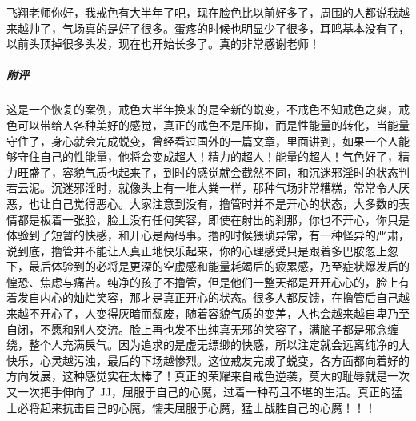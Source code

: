 \begin{case}
    飞翔老师你好，我戒色有大半年了吧，现在脸色比以前好多了，周围的人都说我越来越帅了，气场真的是好了很多。蛋疼的时候也明显少了很多，耳鸣基本没有了，以前头顶掉很多头发，现在也开始长多了。真的非常感谢老师！
    \subparagraph{附评} 这是一个恢复的案例，戒色大半年换来的是全新的蜕变，不戒色不知戒色之爽，戒色可以带给人各种美好的感觉，真正的戒色不是压抑，而是性能量的转化，当能量守住了，身心就会完成蜕变，曾经看过国外的一篇文章，里面讲到，如果一个人能够守住自己的性能量，他将会变成超人！精力的超人！能量的超人！气色好了，精力旺盛了，容貌气质也起来了，到时的感觉就会截然不同，和沉迷邪淫时的状态判若云泥。沉迷邪淫时，就像头上有一堆大粪一样，那种气场非常糟糕，常常令人厌恶，也让自己觉得恶心。大家注意到没有，撸管时并不是开心的状态，大多数的表情都是板着一张脸，脸上没有任何笑容，即使在射出的刹那，你也不开心，你只是体验到了短暂的快感，和开心是两码事。撸的时候猥琐异常，有一种怪异的严肃，说到底，撸管并不能让人真正地快乐起来，你的心理感受只是跟着多巴胺忽上忽下，最后体验到的必将是更深的空虚感和能量耗竭后的疲累感，乃至症状爆发后的惶恐、焦虑与痛苦。纯净的孩子不撸管，但是他们一整天都是开开心心的，脸上有着发自内心的灿烂笑容，那才是真正开心的状态。很多人都反馈，在撸管后自己越来越不开心了，人变得灰暗而颓废，随着容貌气质的变差，人也会越来越自卑乃至自闭，不愿和别人交流。脸上再也发不出纯真无邪的笑容了，满脑子都是邪念缠绕，整个人充满戾气。因为追求的是虚无缥缈的快感，所以注定就会远离纯净的大快乐，心灵越污浊，最后的下场越惨烈。这位戒友完成了蜕变，各方面都向着好的方向发展，这种感觉实在太棒了！真正的荣耀来自戒色逆袭，莫大的耻辱就是一次又一次把手伸向了 JJ，屈服于自己的心魔，过着一种苟且不堪的生活。真正的猛士必将起来抗击自己的心魔，懦夫屈服于心魔，猛士战胜自己的心魔！！！
\end{case}


